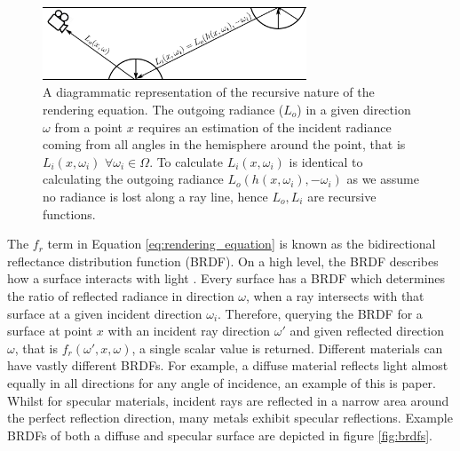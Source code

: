 \documentclass[../dissertation.tex]{subfiles}
\begin{document}
\begin{figure}[h]
\begin{center}
\includegraphics[width=0.7\textwidth]{images/rendering_equation.png}    
\end{center}
\caption{A diagrammatic representation of the recursive nature of the rendering equation. The outgoing radiance ($L_o$) in a given direction $\omega$ from a point $x$ requires an estimation of the incident radiance coming from all angles in the hemisphere around the point, that is $L_i(x,\omega_i)$ $\forall \omega_i \in \Omega$. To calculate $L_i(x, \omega_i)$ is identical to calculating the outgoing radiance $L_o(h(x, \omega_i), -\omega_i)$ as we assume no radiance is lost along a ray line, hence $L_o, L_i$ are recursive functions.}
\label{fig:recursive_rendering}
\end{figure}

The $f_r$ term in Equation \ref{eq:rendering_equation} is known as the bidirectional reflectance distribution function (BRDF). On a high level, the BRDF describes how a surface interacts with light \cite{glassner2014principles}. Every surface has a BRDF which determines the ratio of reflected radiance in direction $\omega$, when a ray intersects with that surface at a given incident direction $\omega_i$. Therefore, querying the BRDF for a surface at point $x$ with an incident ray direction $\omega'$ and given reflected direction $\omega$, that is $f_r(\omega', x , \omega)$,  a single scalar value is returned. Different materials can have vastly different BRDFs. For example, a diffuse material reflects light almost equally in all directions for any angle of incidence, an example of this is paper. Whilst for specular materials, incident rays are reflected in a narrow area around the perfect reflection direction, many metals exhibit specular reflections.  Example BRDFs of both a diffuse and specular surface are depicted in figure \ref{fig:brdfs}.
\end{document}

